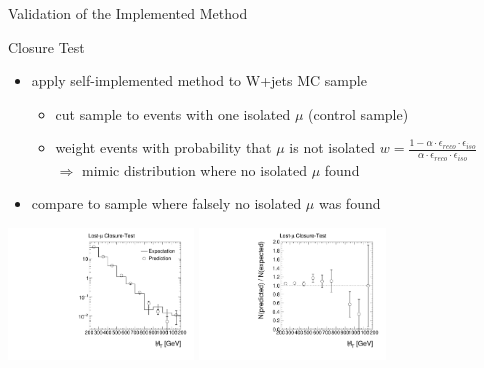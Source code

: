 \begin{frame}{Validation of the Implemented Method}

\begin{block}{Closure Test}
\begin{itemize}
\item apply self-implemented method to W+jets MC sample\\
\begin{itemize}
	\item cut sample to events with one isolated $\mu$ (control sample)
	\item weight events with probability that $\mu$ is not isolated 
	$w = \frac{ 1 - \alpha \cdot \epsilon_{\si{reco}} \cdot \epsilon_{\si{iso}}}{\alpha \cdot \epsilon_{\si{reco}} \cdot \epsilon_{\si{iso}}}$\\
	$\Rightarrow$ mimic distribution where no isolated $\mu$ found 
\end{itemize}
\item compare to sample where falsely no isolated $\mu$ was found
\end{itemize}
\end{block}

\begin{center}
\includegraphics[width = 0.37\textwidth]{plots11/LLClosureMHT.pdf}
\includegraphics[width = 0.37\textwidth]{plots11/LLClosureMHTRatio.pdf}
\end{center}

\end{frame}


